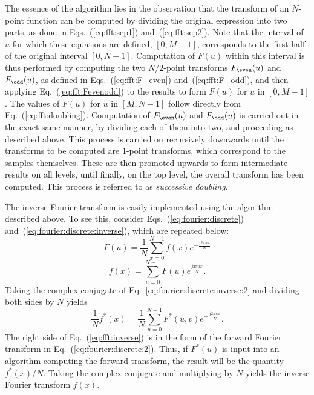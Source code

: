 The essence of the {\fft} algorithm lies in the observation that the
transform of an $N$-point function can be computed by dividing the
original expression into two parts, as done in
Eqs.~(\ref{eq:fft:sep1}) and~(\ref{eq:fft:sep2}).  Note that the
interval of $u$ for which these equations are defined, $[0,M-1]$,
corresponds to the first half of the original interval $[0,N-1]$.
Computation of $F(u)$ within this interval is thus performed by
computing the two $N/2$-point transforms $F_{\even}(u)$ and
$F_{\odd}(u)$, as defined in Eqs.~(\ref{eq:fft:F_even})
and~(\ref{eq:fft:F_odd}), and then applying
Eq.~(\ref{eq:fft:Fevenodd}) to the results to form $F(u)$ for $u$ in
$[0,M-1]$.  The values of $F(u)$ for $u$ in $[M,N-1]$ follow directly
from Eq.~(\ref{eq:fft:doubling}).  Computation of $F_{\even}(u)$ and
$F_{\odd}(u)$ is carried out in the exact same manner, by dividing
each of them into two, and proceeding as described above.  This
process is carried on recursively downwards until the transforms to be
computed are $1$-point transforms, which correspond to the samples
themselves.  These are then promoted upwards to form intermediate
results on all levels, until finally, on the top level, the overall
transform has been computed.  This process is referred to as {\em
  successive doubling\/}.

The inverse Fourier transform is easily implemented using the {\fft}
algorithm described above.  To see this, consider
Eqs.~(\ref{eq:fourier:discrete})
and~(\ref{eq:fourier:discrete:inverse}), which are repeated below:
\begin{equation}
\label{eq:fourier:discrete:2}
  F(u)=\frac{1}{N}\sum_{x=0}^{N-1}f(x)e^{-\frac{j2\pi ux}{N}}
\end{equation}
\begin{equation}
\label{eq:fourier:discrete:inverse:2}
  f(x)=\sum_{u=0}^{N-1}F(u)e^{\frac{j2\pi ux}{N}}\mbox{.}
\end{equation}
Taking the complex conjugate of
Eq.~\ref{eq:fourier:discrete:inverse:2} and dividing both sides by $N$
yields 
\begin{equation}
\label{eq:fft:inverse}
  \frac{1}{N}f^{\ast}(x)=\frac{1}{N}\sum_{u=0}^{N-1}F^{\ast}(u,v)
  e^{-\frac{j2\pi ux}{N}}\mbox{.}
\end{equation}
The right side of Eq.~(\ref{eq:fft:inverse}) is in the form of the
forward Fourier transform in Eq.~(\ref{eq:fourier:discrete:2}).  Thus,
if $F^{\ast}(u)$ is input into an algorithm computing the forward
transform, the result will be the quantity $f^{\ast}(x)/N$.  Taking
the complex conjugate and multiplying by $N$ yields the inverse
Fourier transform $f(x)$.

